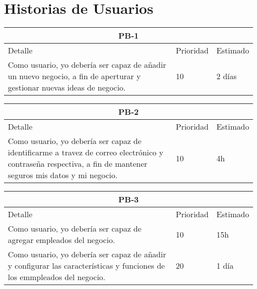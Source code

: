 \chapter{Historias de Usuarios}

\begin{table}[htbp]
	\begin{center}
		\begin{tabular}{|p{10cm} | p{2cm} | p{2cm}|}
			\hline
			\multicolumn{3}{|c|}{PB-1}\\
			\hline
			Detalle & Prioridad & Estimado \\
			\hline
			Como usuario, yo debería ser capaz de añadir un nuevo negocio, a fin de aperturar y gestionar nuevas ideas de negocio. & 10 & 2 días \\
			\hline	
		\end{tabular}
	\end{center}
\end{table}

\begin{table}[htbp]
	\begin{center}
		\begin{tabular}{|p{10cm} | p{2cm} | p{2cm}|}
			\hline
			\multicolumn{3}{|c|}{PB-2}\\
			\hline
			Detalle & Prioridad & Estimado \\
			\hline
			Como usuario, yo debería ser capaz de identificarme a travez de correo electrónico y contraseña respectiva, a fin de mantener seguros mis datos y mi negocio.  & 10 & 4h \\
			\hline	
		\end{tabular}
	\end{center}
\end{table}

\begin{table}[htbp]
	\begin{center}
		\begin{tabular}{|p{10cm} | p{2cm} | p{2cm}|}
			\hline
			\multicolumn{3}{|c|}{PB-3}\\
			\hline
			Detalle & Prioridad & Estimado \\
			\hline
			Como usuario, yo debería ser capaz de agregar empleados del negocio.& 10 & 15h \\
			\hline
			Como usuario, yo debería ser capaz de añadir y configurar las características y funciones de los emmpleados del negocio.& 20 & 1 día \\
			\hline	
		\end{tabular}
	\end{center}
\end{table}

